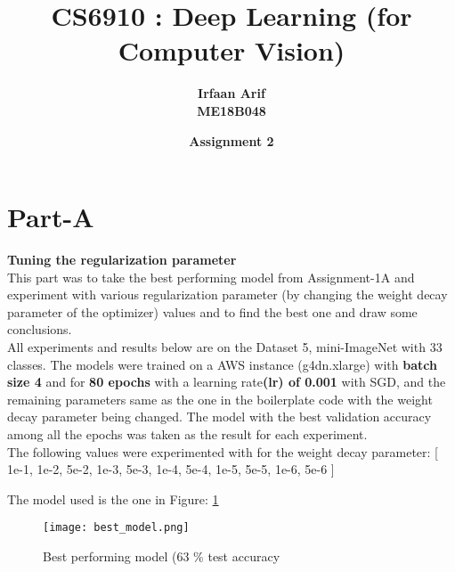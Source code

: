 \documentclass{article}
\title{CS6910 : Deep Learning (for Computer Vision)}
\author{\textbf{Irfaan Arif} \\ {\textbf{ME18B048}}}
\date{\textbf{Assignment 2}}
\begin{document}
\maketitle
\vspace{-1.6em}

\section{Part-A}

\textbf{Tuning the regularization parameter}\\

\noindent
This part was to take the best performing model from Assignment-1A and experiment with various regularization parameter (by changing the weight decay parameter of the optimizer) values and to find the best one and draw some conclusions.\\

\noindent
 All experiments and results below are on the Dataset 5, mini-ImageNet with 33 classes. The models were trained on a AWS instance (g4dn.xlarge)  with \textbf{batch size 4} and for \textbf{80 epochs} with a learning rate\textbf{(lr) of 0.001} with SGD, and the remaining parameters same as the one in the boilerplate code with the weight decay parameter being changed. The model with the best validation accuracy among all the epochs was taken as the result for each experiment. \\

\noindent
The following values were experimented with for the weight decay parameter:
[ 1e-1, 1e-2, 5e-2, 1e-3, 5e-3, 1e-4, 5e-4, 1e-5, 5e-5, 1e-6, 5e-6 ]
 
\noindent
The model used is the one in Figure: \ref{fig:best_model}
\\
\begin{figure}[H]
    \centering
    \texttt{[image: best\_model.png]}
    \caption{Best performing model (63 \% test accuracy}
    \label{fig:best_model}
\end{figure}
\end{document}
